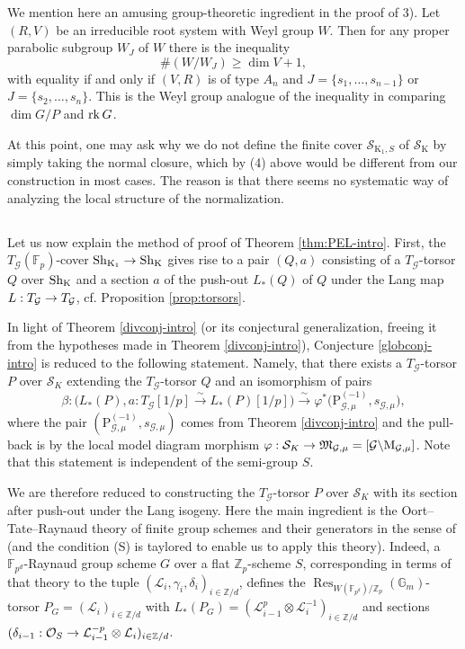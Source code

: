 \documentclass[reqno, 10pt]{amsart}
\makeatletter
\newcommand{\fkM}{\ensuremath{\mathfrak{M}}\xspace}
\newcommand{\BF}{\ensuremath{\mathbb {F}}\xspace}
\newcommand{\BG}{\ensuremath{\mathbb {G}}\xspace}
\newcommand{\BZ}{\ensuremath{\mathbb {Z}}\xspace}
\newcommand{\CG}{\ensuremath{\mathcal {G}}\xspace}
\newcommand{\CL}{\ensuremath{\mathcal {L}}\xspace}
\newcommand{\CO}{\ensuremath{\mathcal {O}}\xspace}
\newcommand{\CS}{\ensuremath{\mathcal {S}}\xspace}
\newcommand{\RK}{\ensuremath{\mathrm {K}}\xspace}
\newcommand{\RP}{\ensuremath{\mathrm {P}}\xspace}
\DeclareMathOperator{\Res}{Res}
\newcommand{\bs}{\backslash}
\theoremstyle{definition}
\numberwithin{equation}{subsection}
\numberwithin{subsubsection}{subsection}
\renewcommand{\to}{%
   \ifbool{@display}{\longrightarrow}{\rightarrow}%
   }
\newcommand{\Mloc}{{\rm M}}
\makeatother
\begin{document}
We mention here an amusing group-theoretic ingredient in the proof of 3).  Let $(R, V)$ be an irreducible root system with Weyl group $W$. Then for any proper parabolic subgroup $W_J$ of $W$  there is the inequality
$$\# (W/W_J)\geq \dim V +1, $$
with equality if and only if $(V, R)$ is of type $A_n$ and $J=\{s_1,  \ldots, s_{n-1}\}$ or $J=\{s_2,  \ldots, s_{n}\}$. This is the Weyl group analogue of the inequality in \cite{OR} comparing $\dim G/P$ and ${\rm rk}\, G$. 

 At this point, one may ask why we do not define the finite cover $\CS_{\RK_1, S}$ of $\CS_{\RK}$ by simply taking the normal closure, which by (4) above would be different from our construction in most cases. The reason is that there seems no systematic way of analyzing the local structure of the normalization. 

 

\subsection{}  Let us now explain the method of proof of Theorem \ref{thm:PEL-intro}. First, the $T_\CG(\BF_p)$-cover ${\rm Sh}_{\RK_1}\to {\rm Sh}_{\RK}$ gives rise to a pair $(Q, a)$ consisting of a $T_\CG$-torsor $Q$ over $ {\rm Sh}_{\RK}$ and a section $a$ of the push-out $L_*(Q)$ of $Q$ under the Lang map $L:T_\CG\to T_\CG$, cf. Proposition \ref{prop:torsors}. 

In  light of Theorem \ref{divconj-intro} (or its conjectural generalization, freeing it from the hypotheses made in  Theorem \ref{divconj-intro}), Conjecture \ref{globconj-intro} is reduced to the following statement.   Namely, that there exists a $T_\CG$-torsor $P$ over $\CS_K$ extending the $T_\CG$-torsor $Q$ and an isomorphism of pairs 
 \[
 \beta: \big(L_*(P), a: T_{\CG}[1/p]\xrightarrow{\sim} L_*(P)[1/p]\big)\xrightarrow{\sim} \varphi^*\big(\RP^{(-1)}_{\CG,\mu}, s_{\CG,\mu}\big),
 \]
 where the pair $(\RP_{\CG,\mu}^{(-1)}, s_{\CG,\mu})$ comes from  Theorem  \ref{divconj-intro} and the pull-back is by the local model diagram morphism $\varphi: \CS_{K}\to \fkM_{\CG,\mu}
 =[\CG\bs \Mloc_{\CG,\mu}]$.  Note that this statement is independent of the semi-group $S$. 
 
 We are therefore reduced to constructing the $T_\CG$-torsor $P$ over $\CS_K$ with its section after push-out under the Lang isogeny. Here the main ingredient is the Oort--Tate--Raynaud theory of finite group schemes and their generators in the sense of \cite{P95} (and the condition  (S) is taylored to enable us to apply  this theory). Indeed, a $\BF_{p^d}$-Raynaud group  scheme $G$ over a flat $\BZ_p$-scheme $S$, corresponding in terms of that theory to the tuple $(\CL_i, \gamma_i, \delta_i)_{i\in\BZ/d}$, defines the $\Res_{W(\BF_{p^d})/\BZ_p}(\BG_m)$-torsor $P_G=(\CL_i)_{i\in\BZ/d}$ with $L_*(P_G)=(\CL_{i-1}^{p}\otimes\CL_i^{-1})_{i\in\BZ/d}$ and sections $(\delta_{i-1}: \CO_S\to\CL_{i-1}^{-p}\otimes\CL_i)_{i\in\BZ/d}$.
 
\end{document}
